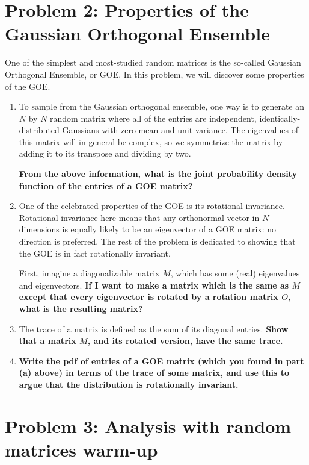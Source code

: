 \documentclass[a4paper]{article}
\begin{document}
\section*{Problem 2: Properties of the Gaussian Orthogonal Ensemble}

One of the simplest and most-studied random matrices is the so-called Gaussian Orthogonal Ensemble, or GOE.  In this problem, we will discover some properties of the GOE.  
\begin{enumerate}[label=(\alph*)]
\item To sample from the Gaussian orthogonal ensemble, one way is to generate an $N$ by $N$ random matrix where all of the entries are independent, identically-distributed Gaussians with zero mean and unit variance.  The eigenvalues of this matrix will in general be complex, so we symmetrize the matrix by adding it to its transpose and dividing by two.  

\textbf{From the above information, what is the joint probability density function of the entries of a GOE matrix?}

\item One of the celebrated properties of the GOE is its rotational invariance. Rotational invariance here means that any orthonormal vector in $N$ dimensions is equally likely to be an eigenvector of a GOE matrix: no direction is preferred.  The rest of the problem is dedicated to showing that the GOE is in fact rotationally invariant.  

First, imagine a diagonalizable matrix $M$, which has some (real) eigenvalues and eigenvectors.  \textbf{If I want to make a matrix which is the same as $M$ except that every eigenvector is rotated by a rotation matrix $O$, what is the resulting matrix?}

\item The trace of a matrix is defined as the sum of its diagonal entries.  \textbf{Show that a matrix $M$, and its rotated version, have the same trace.}

\item \textbf{Write the pdf of entries of a GOE matrix (which you found in part (a) above) in terms of the trace of some matrix, and use this to argue that the distribution is rotationally invariant.}

\end{enumerate}

\section*{Problem 3: Analysis with random matrices warm-up}
\end{document}

